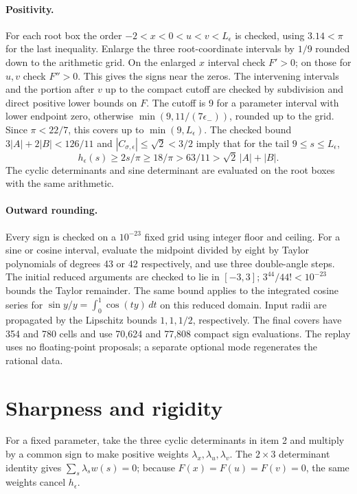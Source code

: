 \documentclass[11pt]{article}
\begin{document}
\paragraph{Positivity.}
For each root box the order \(-2<x<0<u<v<L_\epsilon\) is checked,
using \(3.14<\pi\) for the last inequality.
Enlarge the three root-coordinate intervals by \(1/9\) rounded down
to the arithmetic grid. On the enlarged \(x\) interval check \(F'>0\);
on those for \(u,v\) check \(F''>0\). This gives the signs near the
zeros. The intervening intervals and the portion after \(v\) up
to the compact cutoff are checked by subdivision and direct
positive lower bounds on \(F\). The cutoff is 9 for a parameter
interval with lower endpoint zero, otherwise
\(\min(9,11/(7\epsilon_-))\), rounded up to the grid.
Since \(\pi<22/7\), this covers up to \(\min(9,L_\epsilon)\).
The checked bound \(3|A|+2|B|<126/11\) and
\(|C_{\sigma,\epsilon}|\le\sqrt2<3/2\) imply that for the tail
\(9\le s\le L_\epsilon\),
\[
 h_\epsilon(s)\ge 2s/\pi\ge18/\pi>63/11>
                  \sqrt2\,|A|+|B| .
\]
The cyclic determinants and sine determinant are evaluated on the
root boxes with the same arithmetic.

\paragraph{Outward rounding.}
Every sign is checked on a \(10^{-23}\) fixed grid using integer
floor and ceiling. For a sine or cosine interval, evaluate the midpoint
divided by eight by Taylor polynomials of degrees 43 or 42 respectively,
and use three double-angle steps. The initial reduced arguments are
checked to lie in \([-3,3]\); \(3^{44}/44!<10^{-23}\) bounds the Taylor
remainder. The same bound applies to the integrated cosine series for
\(\sin y/y=\int_0^1\cos(ty)\,dt\) on this reduced domain. Input radii
are propagated by the Lipschitz bounds \(1,1,1/2\), respectively.
The final covers have 354 and 780 cells and use 70,624 and 77,808
compact sign evaluations. The replay uses no floating-point
proposals; a separate optional mode regenerates the rational data.

\section{Sharpness and rigidity}
For a fixed parameter, take the three cyclic determinants in
item 2 and multiply by a common sign to make positive weights
\(\lambda_x,\lambda_u,\lambda_v\).
The \(2\times 3\) determinant identity gives
\(\sum_s\lambda_s w(s)=0\); because \(F(x)=F(u)=F(v)=0\),
the same weights cancel \(h_\epsilon\).
\end{document}
